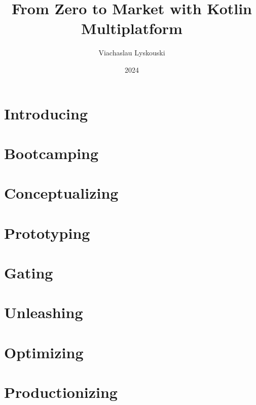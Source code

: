 \documentclass[12pt, a4paper, twoside]{extreport}
\author{Viachaslau Lyskouski}
\title{From Zero to Market with Kotlin Multiplatform}
\date{2024}
\begin{document}

\maketitle



\tableofcontents

\newpage
\section*{Introducing}


\newpage
\section{Bootcamping}



\newpage
\section{Conceptualizing}


\newpage
\section{Prototyping}


\newpage
\section{Gating}


\newpage
\section{Unleashing}


\newpage
\section{Optimizing}


\newpage
\section{Productionizing}

\end{document}

